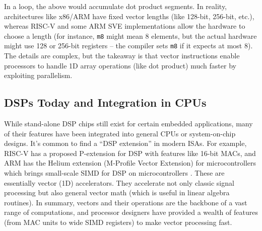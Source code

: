 In a loop, the above would accumulate dot product segments. In reality, architectures like x86/ARM have fixed vector lengths (like 128-bit, 256-bit, etc.), whereas RISC-V and some ARM SVE implementations allow the hardware to choose a length (for instance, \texttt{m8} might mean 8 elements, but the actual hardware might use 128 or 256-bit registers – the compiler sets \texttt{m8} if it expects at most 8). The details are complex, but the takeaway is that vector instructions enable processors to handle 1D array operations (like dot product) much faster by exploiting parallelism.

\subsection{DSPs Today and Integration in CPUs} 
While stand-alone DSP chips still exist for certain embedded applications, many of their features have been integrated into general CPUs or system-on-chip designs. It’s common to find a “DSP extension” in modern ISAs. For example, RISC-V has a proposed P-extension for DSP with features like 16-bit MACs, and ARM has the Helium extension (M-Profile Vector Extension) for microcontrollers which brings small-scale SIMD for DSP on microcontrollers \cite{riscv-p-extension, marsh2020helium}. These are essentially vector (1D) accelerators. They accelerate not only classic signal processing but also general vector math (which is useful in linear algebra routines). In summary, vectors and their operations are the backbone of a vast range of computations, and processor designers have provided a wealth of features (from MAC units to wide SIMD registers) to make vector processing fast.

